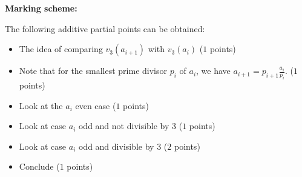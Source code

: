 {\bigskip

\textbf{Marking scheme:}

The following additive partial points can be obtained:
\begin{itemize}
\item The idea of comparing $v_3(a_{i+1})$ with $v_3(a_i)$ \dotfill ($1$ points)
\item Note that for the smallest prime divisor $p_i$ of $a_i$, we have $a_{i+1} = p_{i+1}\frac{a_i}{p_i}$. \dotfill ($1$ points)
\item Look at the $a_i$ even case \dotfill ($1$ points)
\item Look at case $a_i$ odd and not divisible by 3 \dotfill ($1$ points)
\item Look at case $a_i$ odd and divisible by 3 \dotfill ($2$ points)
\item Conclude \dotfill ($1$ points)
\end{itemize}
}


